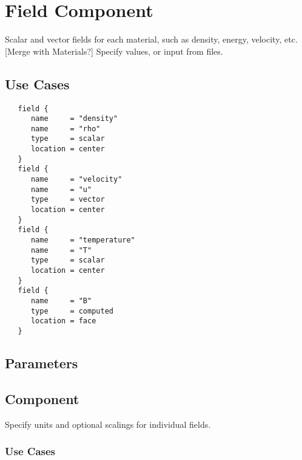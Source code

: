 \section{Field Component} \label{s:component-field}

Scalar and vector fields for each material, such as
 density, energy, velocity, etc.  [Merge with Materials?]  Specify
 values, or input from files.

\subsection{Use Cases}
\begin{verbatim}
   field {
      name     = "density"
      name     = "rho"
      type     = scalar
      location = center
   }
   field {
      name     = "velocity"
      name     = "u"
      type     = vector
      location = center
   }
   field {
      name     = "temperature"
      name     = "T"
      type     = scalar
      location = center
   }
   field {
      name     = "B"
      type     = computed
      location = face
   }
\end{verbatim}

\subsection{Parameters}

\subsection{ Component} \label{ss:component-units}

 Specify units and optional scalings for individual
 fields.  

\subsubsection{Use Cases}
